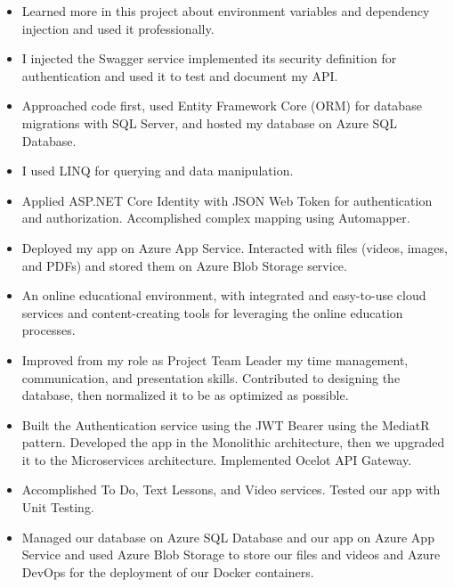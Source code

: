 \documentclass[10pt,a4paper,ragged2e,withhyper]{altacv}
\begin{document}
\begin{paracol}{2}
\divider

\begin{itemize}
\item Learned more in this project about environment variables and dependency injection and used it professionally.
\item I injected the Swagger service implemented its security definition for authentication and used it to test and document my API.
\item Approached code first, used Entity Framework Core (ORM) for database migrations with SQL Server, and hosted my database on Azure SQL Database.
\item I used LINQ for querying and data manipulation.
\item Applied ASP.NET Core Identity with JSON Web Token for authentication and authorization. Accomplished complex mapping using Automapper.
\item Deployed my app on Azure App Service. Interacted with files (videos, images, and PDFs) and stored them on Azure Blob Storage service.
\end{itemize}

\divider

\begin{itemize}
\item An online educational environment, with integrated and easy-to-use cloud services and content-creating tools for leveraging the online education processes.
\item Improved from my role as Project Team Leader my time management, communication, and presentation skills. Contributed to designing the database, then normalized it to be as optimized as possible.
\item Built the Authentication service using the JWT Bearer using the MediatR pattern. Developed the app in the Monolithic architecture, then we upgraded it to the Microservices architecture. Implemented Ocelot API Gateway.
\item Accomplished To Do, Text Lessons, and Video services. Tested our app with Unit Testing.
\item Managed our database on Azure SQL Database and our app on Azure App Service and used Azure Blob Storage to store our files and videos and Azure DevOps for the deployment of our Docker containers.
\end{itemize}


\end{paracol}
\end{document}
